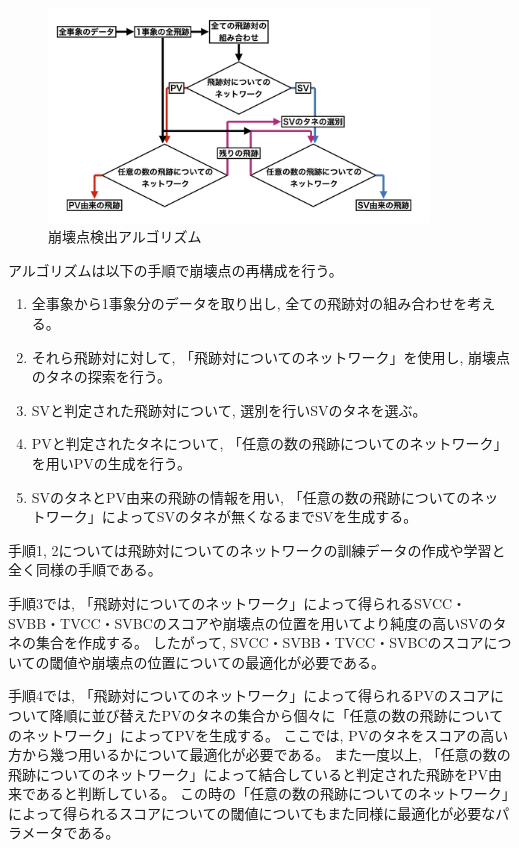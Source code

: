 \begin{figure}[htbp]
 \centering
 \includegraphics[width=0.9\textwidth, clip]{Figure/4VertexFinderwithDL/4-1-0-1VertexFinderAlgorithm.png}
 \caption{崩壊点検出アルゴリズム}
 \label{4-1-0-1VertexFinderAlgorithm}
\end{figure}

アルゴリズムは以下の手順で崩壊点の再構成を行う。

\begin{enumerate}
 \item 全事象から1事象分のデータを取り出し, 全ての飛跡対の組み合わせを考える。
 \item それら飛跡対に対して, 「飛跡対についてのネットワーク」を使用し, 崩壊点のタネの探索を行う。
 \item SVと判定された飛跡対について, 選別を行いSVのタネを選ぶ。
 \item PVと判定されたタネについて, 「任意の数の飛跡についてのネットワーク」を用いPVの生成を行う。
 \item SVのタネとPV由来の飛跡の情報を用い, 「任意の数の飛跡についてのネットワーク」によってSVのタネが無くなるまでSVを生成する。
\end{enumerate}

手順1, 2については飛跡対についてのネットワークの訓練データの作成や学習と全く同様の手順である。

手順3では, 「飛跡対についてのネットワーク」によって得られるSVCC・SVBB・TVCC・SVBCのスコアや崩壊点の位置を用いてより純度の高いSVのタネの集合を作成する。
したがって, SVCC・SVBB・TVCC・SVBCのスコアについての閾値や崩壊点の位置についての最適化が必要である。

手順4では, 「飛跡対についてのネットワーク」によって得られるPVのスコアについて降順に並び替えたPVのタネの集合から個々に「任意の数の飛跡についてのネットワーク」によってPVを生成する。
ここでは, PVのタネをスコアの高い方から幾つ用いるかについて最適化が必要である。
また一度以上, 「任意の数の飛跡についてのネットワーク」によって結合していると判定された飛跡をPV由来であると判断している。
この時の「任意の数の飛跡についてのネットワーク」によって得られるスコアについての閾値についてもまた同様に最適化が必要なパラメータである。

